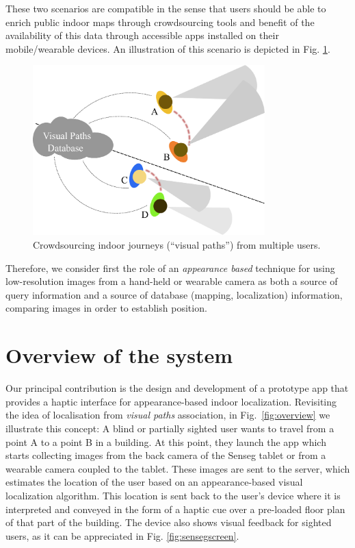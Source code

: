These two scenarios are compatible in the sense that users should be able to enrich public indoor maps through crowdsourcing tools and benefit of the availability of this data through accessible apps installed on their mobile/wearable devices. An illustration of this scenario is depicted in Fig. \ref{fig:associatingViews}.

\begin{figure}[h]
\centering
\includegraphics[width=0.8\textwidth]{gfx/Chapter06/AssociatingViews.pdf}
\caption{Crowdsourcing indoor journeys (``visual paths'') from multiple users.}
\label{fig:associatingViews}
\end{figure}

Therefore, we consider first the role of an {\em appearance based} technique for using low-resolution images from a hand-held or wearable camera as both a source of query information and a source of database (mapping, localization) information, comparing images in order to establish position. 

\section{Overview of the system}
\label{sec:overview}

Our principal contribution is the design and development of a prototype app that provides a haptic interface for appearance-based indoor localization. Revisiting the idea of localisation from \emph{visual paths} association, in Fig.~\ref{fig:overview} we illustrate this concept: A blind or partially sighted user wants to travel from a point A to a point B in a building. At this point, they launch the app which starts collecting images from the back camera of the Senseg tablet or from a wearable camera coupled to the tablet. These images are sent to the server, which estimates the location of the user based on an appearance-based visual localization algorithm. This location is sent back to the user's device where it is interpreted and conveyed in the form of a haptic cue over a pre-loaded floor plan of that part of the building. The device also shows visual feedback for sighted users, as it can be appreciated in Fig. \ref{fig:sensegscreen}.

